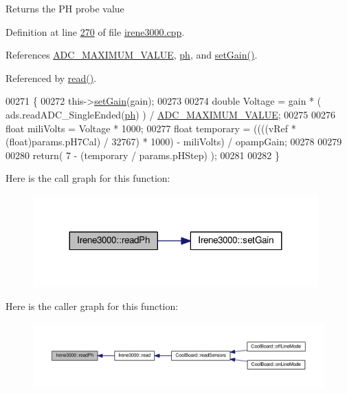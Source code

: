 \begin{DoxyReturn}{Returns}
the PH probe value 
\end{DoxyReturn}


Definition at line \hyperlink{irene3000_8cpp_source_l00270}{270} of file \hyperlink{irene3000_8cpp_source}{irene3000.\+cpp}.



References \hyperlink{_irene3000_8h_source_l00018}{A\+D\+C\+\_\+\+M\+A\+X\+I\+M\+U\+M\+\_\+\+V\+A\+L\+UE}, \hyperlink{_irene3000_8h_source_l00027}{ph}, and \hyperlink{irene3000_8cpp_source_l00242}{set\+Gain()}.



Referenced by \hyperlink{irene3000_8cpp_source_l00035}{read()}.


\begin{DoxyCode}
00271 \{
00272   this->\hyperlink{class_irene3000_aff7c5da186b388e7272e63ff88a20c34}{setGain}(gain);
00273 
00274   \textcolor{keywordtype}{double} Voltage =  gain * ( ads.readADC\_SingleEnded(\hyperlink{_irene3000_8h_af771ceafe0e6524dd8497d4305dfe778}{ph}) ) / \hyperlink{_irene3000_8h_ae04444a85a37b5dce09107f2ce2b2c80}{ADC\_MAXIMUM\_VALUE};
00275 
00276   \textcolor{keywordtype}{float} miliVolts = Voltage * 1000;
00277   \textcolor{keywordtype}{float} temporary = ((((vRef * (float)params.pH7Cal) / 32767) * 1000) - miliVolts) / opampGain;
00278 
00279 
00280  \textcolor{keywordflow}{return}( 7 - (temporary / params.pHStep) );
00281 
00282 \}
\end{DoxyCode}
Here is the call graph for this function\+:
\nopagebreak
\begin{figure}[H]
\begin{center}
\leavevmode
\includegraphics[width=311pt]{class_irene3000_abf3db725fabb0634ec889b32068a5eec_cgraph}
\end{center}
\end{figure}
Here is the caller graph for this function\+:
\nopagebreak
\begin{figure}[H]
\begin{center}
\leavevmode
\includegraphics[width=350pt]{class_irene3000_abf3db725fabb0634ec889b32068a5eec_icgraph}
\end{center}
\end{figure}
\mbox{\label{class_irene3000_a94ad40f281d83ad1be20bf1edd6fe802}} 
